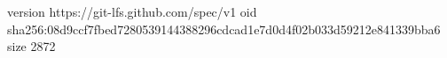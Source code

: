 version https://git-lfs.github.com/spec/v1
oid sha256:08d9ccf7fbed7280539144388296cdcad1e7d0d4f02b033d59212e841339bba6
size 2872

